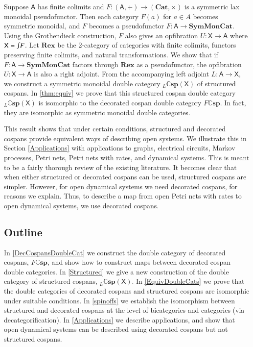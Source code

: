 \documentclass[a4paper,onecolumn, superscriptaddress,10pt, accepted=2022-03-25, issue=SS, volume=VV, shorttitle=papers/compositionality-VV-SS]{compositionalityarticle}
\let\maps\colon
\newcommand{\A}{\mathsf{A}}
\newcommand{\X}{\mathsf{X}}
\newcommand{\bicat}{\mathbf}
\newcommand{\Cat}{\bicat{Cat}}
\newcommand{\Rex}{\bicat{Rex}}
\newcommand{\SMC}{\bicat{SymMonCat}}
\newcommand{\double}[1]{\mathbf{\mathbb #1}}
\newcommand{\lCsp}{\double{Csp}}
\newcommand{\inta}{\raisebox{.3\depth}{$\smallint\hspace{-.01in}$}}
\begin{document}
Suppose $\A$ has finite colimits and $F \maps (\A , +) \to (\Cat, \times)$ is a symmetric lax monoidal pseudofunctor.  Then each category $F(a)$ for $a \in A$ becomes symmetric monoidal, and $F$ becomes a pseudofunctor $F \maps \A \to \SMC$.    Using the Grothendieck construction, $F$ also gives an opfibration $U \maps \X \to \A$ where $\X = \inta F$.   Let $\Rex$ be the 2-category of categories with finite colimits, functors preserving finite colimits, and natural transformations.  We show that if $F \maps \A \to \SMC$ factors through $\Rex$ as a pseudofunctor, the opfibration $U \maps \X \to \A$ is also a right adjoint.   From the accompanying left adjoint $L \maps \A \to \X$, we  construct a symmetric monoidal double category ${}_L \lCsp(\X)$ of structured cospans.  In \cref{thm:equiv} we prove that this structured cospan double category ${}_L \lCsp(\X)$ is isomorphic to the decorated cospan double category $F \lCsp$.   In fact, they are isomorphic as symmetric monoidal double categories.

This result shows that under certain conditions, structured and decorated cospans provide equivalent ways of describing open systems.  We illustrate this in Section \ref{Applications} with applications to graphs, electrical circuits, Markov processes, Petri nets, Petri nets with rates, and dynamical systems.   This is meant to be a fairly thorough review of the existing literature.   It becomes clear that when either structured or decorated cospans can be used, structured cospans are simpler.  However, for open dynamical systems we need decorated cospans, for reasons we explain.   Thus, to describe a map from open Petri nets with rates to open dynamical systems, we use decorated cospans.

\subsection*{Outline}

In \cref{DecCospansDoubleCat} we construct the double category of decorated cospans, $F\lCsp$, and show how to construct maps between decorated cospan double categories. In \cref{Structured} we give a new construction of the double category of structured cospans, ${}_L \lCsp(\X)$.  In \cref{EquivDoubleCats} we prove that the double categories of decorated cospans and structured cospans are isomorphic under suitable conditions.  In \cref{spinoffs} we establish the isomorphism between structured and decorated cospans at the level of bicategories and categories (via decategorification).  In \cref{Applications} we describe applications, and show that open dynamical systems can be described using decorated cospans but not structured cospans.
\end{document}
